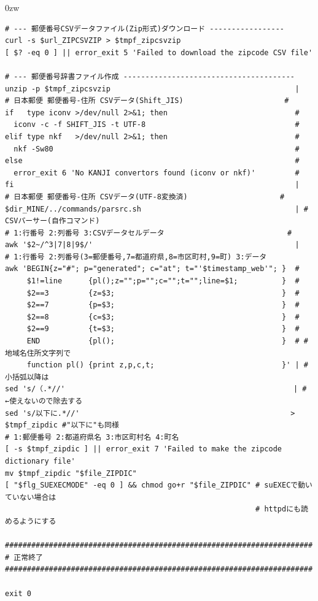 \begin{indentation}{-9mm}{0zw}
\begin{verbatim}
# --- 郵便番号CSVデータファイル(Zip形式)ダウンロード -----------------
curl -s $url_ZIPCSVZIP > $tmpf_zipcsvzip
[ $? -eq 0 ] || error_exit 5 'Failed to download the zipcode CSV file'

# --- 郵便番号辞書ファイル作成 ---------------------------------------
unzip -p $tmpf_zipcsvzip                                          |
# 日本郵便 郵便番号-住所 CSVデータ(Shift_JIS)                       #
if   type iconv >/dev/null 2>&1; then                             #
  iconv -c -f SHIFT_JIS -t UTF-8                                  #
elif type nkf   >/dev/null 2>&1; then                             #
  nkf -Sw80                                                       #
else                                                              #
  error_exit 6 'No KANJI convertors found (iconv or nkf)'         #
fi                                                                |
# 日本郵便 郵便番号-住所 CSVデータ(UTF-8変換済)                     #
$dir_MINE/../commands/parsrc.sh                                   | # CSVパーサー(自作コマンド)
# 1:行番号 2:列番号 3:CSVデータセルデータ                            #
awk '$2~/^3|7|8|9$/'                                              |
# 1:行番号 2:列番号(3=郵便番号,7=都道府県,8=市区町村,9=町) 3:データ
awk 'BEGIN{z="#"; p="generated"; c="at"; t="'$timestamp_web'"; }  #
     $1!=line      {pl();z="";p="";c="";t="";line=$1;          }  #
     $2==3         {z=$3;                                      }  #
     $2==7         {p=$3;                                      }  #
     $2==8         {c=$3;                                      }  #
     $2==9         {t=$3;                                      }  #
     END           {pl();                                      }  # #   地域名住所文字列で
     function pl() {print z,p,c,t;                             }' | #   小括弧以降は
sed 's/（.*//'                                                    | # ←使えないので除去する
sed 's/以下に.*//'                                                > $tmpf_zipdic #"以下に"も同様
# 1:郵便番号 2:都道府県名 3:市区町村名 4:町名
[ -s $tmpf_zipdic ] || error_exit 7 'Failed to make the zipcode dictionary file'
mv $tmpf_zipdic "$file_ZIPDIC"
[ "$flg_SUEXECMODE" -eq 0 ] && chmod go+r "$file_ZIPDIC" # suEXECで動いていない場合は
                                                         # httpdにも読めるようにする

######################################################################
# 正常終了
######################################################################

exit 0
\end{verbatim}
\end{indentation}


